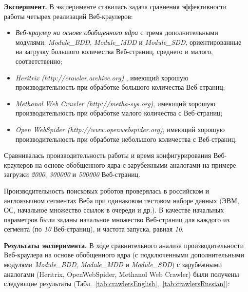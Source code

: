 \textbf{Эксперимент.} В эксперименте ставилась задача сравнения эффективности работы четырех реализаций Веб-краулеров:
\begin{itemize}
	\item \textit{Веб-краулер на основе обобщенного ядра} с тремя дополнительными модулями: \textit{Module\_BDD}, \textit{Module\_MDD} и \textit{Module\_SDD}, ориентированные на загрузку большого количества Веб-страниц, среднего и малого, соответственно;
	\item \textit{Heritrix (http://crawler.archive.org)} \cite{MohrKimptonStack}, имеющий хорошую производительность при обработке большого количества Веб-страниц;
	\item \textit{Methanol Web Crawler (http://metha-sys.org)}, имеющий хорошую производительность при обработке малого количества с Веб-страниц;
	\item \textit{Open WebSpider (http://www.openwebspider.org)}, имеющий хорошую производительность при обработке небольшого количества с Веб-страниц.
\end{itemize}

Сравнивалась производительность работы и время конфигурирования Веб-краулеров на основе обобщенного ядра с зарубежными аналогами на примере загрузки \textit{2000}, \textit{300000} и \textit{500000} Веб-страниц.

Производительность поисковых роботов проверялась в российском и англоязычном сегментах Веба при одинаковом тестовом наборе данных (ЭВМ, ОС, начальное множество ссылок в очереди и др.). В качестве начальных параметров были заданы начальное множество Веб-страниц для каждого из сегмента (по \textit{10} Веб-страниц), и частота запуска, равная \textit{10}.

\textbf{Результаты эксперимента.} В ходе сравнительного анализа производительности Веб-краулера на основе обобщенного ядра (с подключенными дополнительными модулями \textit{Module\_BDD}, \textit{Module\_MDD} и \textit{Module\_SDD}) с зарубежными аналогами (Heritrix, OpenWebSpider, Methanol Web Crawler) были получены следующие результаты (Табл.~\cref{tab:crawlersEnglish},~\cref{tab:crawlersRussian}):

